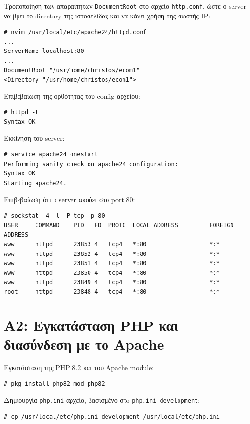 \documentclass[12pt]{article}
\begin{document}
Τροποποίηση των απαραίτητων \lstinline{DocumentRoot} στο αρχείο
\lstinline{http.conf}, ώστε ο server να βρει το directory της ιστοσελίδας και
να κάνει χρήση της σωστής IP:

\begin{lstlisting}
# nvim /usr/local/etc/apache24/httpd.conf
...
ServerName localhost:80
...
DocumentRoot "/usr/home/christos/ecom1"
<Directory "/usr/home/christos/ecom1">
\end{lstlisting}

Επιβεβαίωση της ορθότητας του config αρχείου:

\begin{lstlisting}
# httpd -t
Syntax OK
\end{lstlisting}

Εκκίνηση του server:

\begin{lstlisting}
# service apache24 onestart
Performing sanity check on apache24 configuration:
Syntax OK
Starting apache24.
\end{lstlisting}

Επιβεβαίωση ότι ο server ακούει στο port 80:

\begin{lstlisting}
# sockstat -4 -l -P tcp -p 80
USER     COMMAND    PID   FD  PROTO  LOCAL ADDRESS         FOREIGN ADDRESS
www      httpd      23853 4   tcp4   *:80                  *:*
www      httpd      23852 4   tcp4   *:80                  *:*
www      httpd      23851 4   tcp4   *:80                  *:*
www      httpd      23850 4   tcp4   *:80                  *:*
www      httpd      23849 4   tcp4   *:80                  *:*
root     httpd      23848 4   tcp4   *:80                  *:*
\end{lstlisting}

\section{Α2: Εγκατάσταση PHP και διασύνδεση με το Apache}

Εγκατάσταση της PHP 8.2 και του Apache module:

\begin{lstlisting}
# pkg install php82 mod_php82
\end{lstlisting}

Δημιουργία \lstinline{php.ini} αρχείο, βασισμένο στo
\lstinline{php.ini-development}:

\begin{lstlisting}
# cp /usr/local/etc/php.ini-development /usr/local/etc/php.ini
\end{lstlisting}
\end{document}
